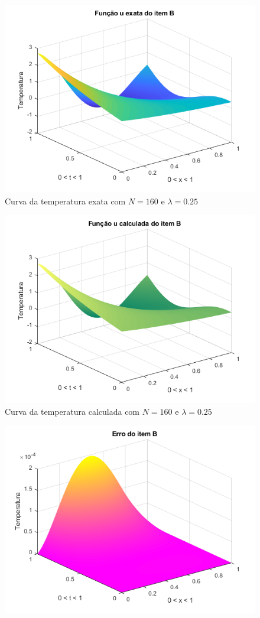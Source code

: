 \documentclass[12pt]{article}
\begin{document}
\begin{spacing}{1.5}
\begin{figure}
    \centering
    \includegraphics[width=0.8\linewidth]{Primeira_Tarefa/ItemB/n160_lambda0-25_exata.png}
    \caption{Curva da temperatura exata com $N=160$ e $\lambda=0.25$}
    \label{fig:B_n160lambda0-25_exata}
\end{figure}
\begin{figure}
    \centering
    \includegraphics[width=0.8\linewidth]{Primeira_Tarefa/ItemB/n160_lambda0-25_calc.png}
    \caption{Curva da temperatura calculada com $N=160$ e $\lambda=0.25$}
    \label{fig:B_n160lambda0-25_calc}
\end{figure}
\begin{figure}
    \centering
    \includegraphics[width=0.8\linewidth]{Primeira_Tarefa/ItemB/n160_lambda0-25_erro.png}

\end{figure}
\end{spacing}
\end{document}
